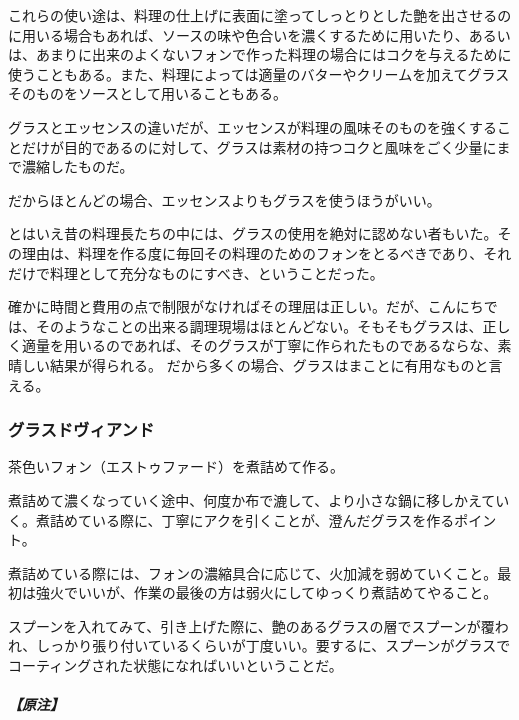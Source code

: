\begin{recette}
これらの使い途は、料理の仕上げに表面に塗ってしっとりとした艶を出させるのに用いる場合もあれば、ソースの味や色合いを濃くするために用いたり、あるいは、あまりに出来のよくないフォンで作った料理の場合にはコクを与えるために使うこともある。また、料理によっては適量のバターやクリームを加えてグラスそのものをソースとして用いることもある。

グラスとエッセンスの違いだが、エッセンスが料理の風味そのものを強くすることだけが目的であるのに対して、グラスは素材の持つコクと風味をごく少量にまで濃縮したものだ。

だからほとんどの場合、エッセンスよりもグラスを使うほうがいい。

とはいえ昔の料理長たちの中には、グラスの使用を絶対に認めない者もいた。その理由は、料理を作る度に毎回その料理のためのフォンをとるべきであり、それだけで料理として充分なものにすべき、ということだった。

確かに時間と費用の点で制限がなければその理屈は正しい。だが、こんにちでは、そのようなことの出来る調理現場はほとんどない。そもそもグラスは、正しく適量を用いるのであれば、そのグラスが丁寧に作られたものであるならな、素晴しい結果が得られる。
だから多くの場合、グラスはまことに有用なものと言える。

\atoaki{}

\hypertarget{glace-de-viande}{%
\subsubsection{グラスドヴィアンド}\label{glace-de-viande}}



茶色いフォン（エストゥファード）を煮詰めて作る。

煮詰めて濃くなっていく途中、何度か布で漉して、より小さな鍋に移しかえていく。煮詰めている際に、丁寧にアクを引くことが、澄んだグラスを作るポイント。

煮詰めている際には、フォンの濃縮具合に応じて、火加減を弱めていくこと。最初は強火でいいが、作業の最後の方は弱火にしてゆっくり煮詰めてやること。

スプーンを入れてみて、引き上げた際に、艶のあるグラスの層でスプーンが覆われ、しっかり張り付いているくらいが丁度いい。要するに、スプーンがグラスでコーティングされた状態になればいいということだ。

\hypertarget{nota-glace-de-viande}{%
\subparagraph{【原注】}\label{nota-glace-de-viande}}


\end{recette}
